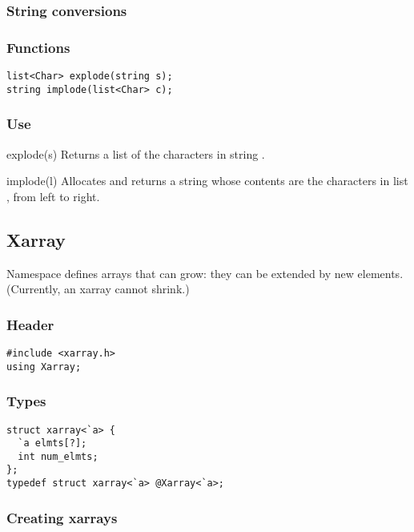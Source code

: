 \subsubsection*{String conversions}
\subsubsection*{Functions}
\begin{verbatim}
list<Char> explode(string s);
string implode(list<Char> c);
\end{verbatim}

\subsubsection*{Use}

\begin{defun}{explode}{(s)}
Returns a list of the characters in string .
\end{defun}

\begin{defun}{implode}{(l)}
Allocates and returns a string whose contents are the characters in list
, from left to right.
\end{defun}

\subsection{Xarray}

Namespace  defines arrays that can grow: they can be
extended by new elements.  (Currently, an xarray cannot shrink.)

\subsubsection*{Header}
\begin{verbatim}
#include <xarray.h>
using Xarray;
\end{verbatim}

\subsubsection*{Types}
\begin{verbatim}
struct xarray<`a> {
  `a elmts[?];
  int num_elmts;
};
typedef struct xarray<`a> @Xarray<`a>;
\end{verbatim}

\subsubsection*{Creating xarrays}
